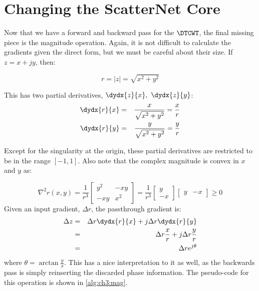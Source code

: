 \section{Changing the ScatterNet Core}\label{sec:ch3:scat}
Now that we have a forward and backward pass for the $\DTCWT$, the final missing
piece is the magnitude operation. Again, it is not difficult to calculate the
gradients given the direct form, but we must be careful about their size. If $z
= x + jy$, then:

\begin{equation}
  r = |z| =  \sqrt{x^2 + y^2}
\end{equation}

This has two partial derivatives, $\dydx{z}{x},\ \dydx{z}{y}$:
\begin{eqnarray}
  \dydx{r}{x} & = & \frac{x}{\sqrt{x^2 + y^2}} = \frac{x}{r}\\
  \dydx{r}{y} & = & \frac{y}{\sqrt{x^2 + y^2}} = \frac{y}{r} 
\end{eqnarray}

Except for the singularity at the origin, these partial derivatives are restricted to be in the
range $[-1, 1]$. Also note that the complex magnitude is convex in $x$ and $y$ as:

\begin{equation}
\nabla^2 r(x,y) = \frac{1}{r^3} 
\begin{bmatrix}
  y^2 & -xy \\
  -xy & x^2
\end{bmatrix}
 = \frac{1}{r^3} \begin{bmatrix} y \\ -x \end{bmatrix} 
 \begin{bmatrix} y & -x \end{bmatrix} \geq 0 
\end{equation}
Given an input gradient, $\Delta r$, the passthrough gradient is:
\begin{eqnarray}
  \Delta z & = & \Delta r \dydx{r}{x} + j\Delta r \dydx{r}{y} \\
           &= & \Delta r \frac{x}{r} + j\Delta r \frac{y}{r} \\
           &=& \Delta r e^{j\theta}
\end{eqnarray}
where $\theta = \arctan{\frac{y}{x}}$. This has a nice interpretation to it as
well, as the backwards pass is simply reinserting the discarded phase
information. The pseudo-code for this operation is shown in
\autoref{alg:ch3:mag}.

